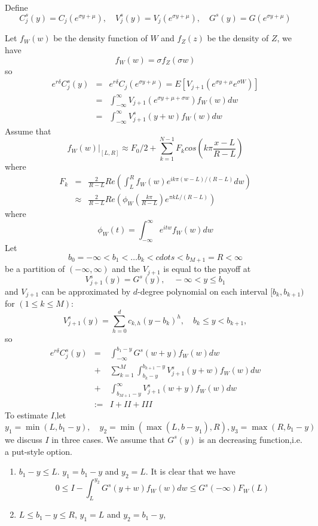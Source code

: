 \documentclass[numreferences]{kluwer}    %
\begin{document}
\begin{article}
Define
\[
C^{s}_j(y)=C_j(e^{\sigma y+\mu}),\quad V^{s}_{j}(y)=V_j(e^{\sigma
y+\mu}), \quad G^s(y)=G(e^{\sigma y+\mu})
\]

Let $f_W(w)$ be the density function of $W$ and $f_Z(z)$ be the
density of $Z$, we have
\[
f_W(w)=\sigma f_Z(\sigma w)
\]
so
\begin{eqnarray*}
e^{r\delta} C^s_j(y)&=&e^{r\delta} C_j(e^{\sigma
y+\mu})=E[V_{j+1}(e^{\sigma y+\mu}e^{\sigma W})]\\
&=&\int^{\infty}_{-\infty}V_{j+1}(e^{\sigma y+\mu +\sigma
w})f_W(w)dw\\
&=&\int^{\infty}_{-\infty}V^s_{j+1}(y+w)f_W(w)dw
\end{eqnarray*}
Assume that
\[
f_W(w)|_{[L,R]}\approx F_0/2+\sum_{k=1}^{N-1} F_k
cos(k\pi\frac{x-L}{R-L})
\]
where
\begin{eqnarray*}
F_k&=&\frac{2}{R-L}Re(\int^R_Lf_W(w)e^{i k \pi
(w-L)/(R-L)}dw)\\
&\approx& \frac{2}{R-L}Re( \phi_W(\frac{k\pi}{R-L}) e^{ \pi
kL/(R-L)})
\end{eqnarray*}
where
\[
\phi_W(t)=\int^{\infty}_{-\infty}e^{itw}f_W(w)dw
\]
Let
\[
b_0=-\infty<b_1<\dots b_{k}<cdots<b_{M+1}=R<\infty
\]
be a partition of $(-\infty,\infty)$ and the $V_{j+1}$ is equal to
the payoff at
\[
V^s_{j+1}(y)=G^s(y), \quad -\infty<y\le b_1
\]
and  $V_{j+1}$ can be approximated by $d$-degree polynomial on each
interval $[b_k,b_{k+1})$ for  $(1\le k\le M)$:
\[
V^s_{j+1}(y)=\sum_{h=0}^d c_{k,h}(y-b_k)^{h}, \quad  b_{k}\le y <
b_{k+1},
\]
so
\begin{eqnarray*}
e^{r\delta}C^s_j(y)&=&\int^{b_1-y}_{-\infty}G^s(w+y)f_W(w)dw\\
&+&\sum_{k=1}^{M}
\int^{b_{k+1}-y}_{b_k-y}V^s_{j+1}(y+w)f_W(w)dw\\
&+&\int^{\infty}_{b_{M+1}-y}V^s_{j+1}(w+y)f_W(w)dw\\
 &:=&I+II+III
\end{eqnarray*}
To estimate $I$,let
\[
y_1=\min(L,b_1-y),\quad y_2=\min(\max(L,b-y_1),R), y_3=\max(R,b_1-y)
\]
we discuss $I$ in three cases. We assume that $G^s(y)$ is an
decreasing function,i.e. a put-style option.
\begin{enumerate}
\item $b_1-y\le L$. $y_1=b_1-y$ and $y_2=L$. It is clear that we have
\begin{equation}\label{gsb}
0\le I-\int^{y_2}_L G^s(y+w)f_W(w)dw  \le G^s(-\infty)F_W(L)
\end{equation}
\item $L\le b_1-y\le R$, $y_1=L$ and $y_2=b_1-y$,

\end{enumerate}
\end{article}
\end{document}

